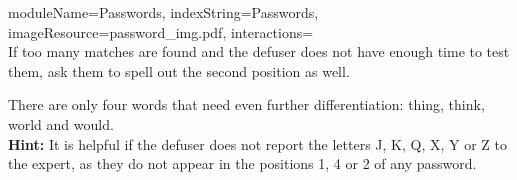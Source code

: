 \documentclass{../../ktane-mod}
\begin{document}
\begin{module}{
  moduleName=Passwords,
  indexString=Passwords,
  imageResource=password_img.pdf,
  interactions=\keysymbol
}
  \medskip\\
  If too many matches are found and the defuser does not have enough time to test them, ask them to spell out the second position as well.

  There are only four words that need even further differentiation: thing, think, world and would.\bigskip\\

  \textbf{Hint:} It is helpful if the defuser does not report the letters J, K, Q, X, Y or Z to the expert, as they do not appear in the positions 1, 4 or 2 of any password.
\end{module}
\end{document}
